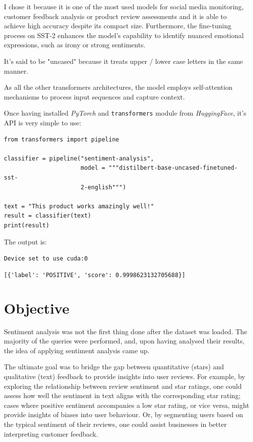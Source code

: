 \documentclass{Configuration_Files/PoliMi3i_thesis}
\begin{document}
I chose it because it is one of the most used models for social media monitoring, customer feedback analysis or product review assessments and it is able to achieve high accuracy despite its compact size.
Furthermore, the fine-tuning process on SST-2 enhances the model's capability to identify nuanced emotional expressions, such as irony or strong sentiments. 

It's said to be "uncased" because it treats upper / lower case letters in the same manner.

As all the other transformers architectures, the model employs self-attention mechanisms to process input sequences and capture context.

Once having installed \textit{PyTorch} and \texttt{transformers} module from \textit{HuggingFace}, it's API is very simple to use:

\bigskip

\begin{verbatim}
from transformers import pipeline

classifier = pipeline("sentiment-analysis", 
                      model = """distilbert-base-uncased-finetuned-sst-
                      2-english""")

text = "This product works amazingly well!"
result = classifier(text)
print(result)
\end{verbatim}

\bigskip

The output is: 

\texttt{Device set to use cuda:0}

\verb|[{'label': 'POSITIVE', 'score': 0.9998623132705688}]|

\section{Objective}
Sentiment analysis was not the first thing done after the dataset was loaded. The majority of the queries were performed, and, upon having analysed their results, the idea of applying sentiment analysis came up. 

The ultimate goal was to bridge the gap between quantitative (stars) and qualitative (text) feedback to provide insights into user reviews. For example, by exploring the relationship between review sentiment and star ratings, one could assess how well the sentiment in text aligns with the corresponding star rating; cases where positive sentiment accompanies a low star rating, or vice versa, might provide insights of biases into user behaviour. Or, by segmenting users based on the typical sentiment of their reviews, one could assist businesses in better interpreting customer feedback. 
\end{document}

